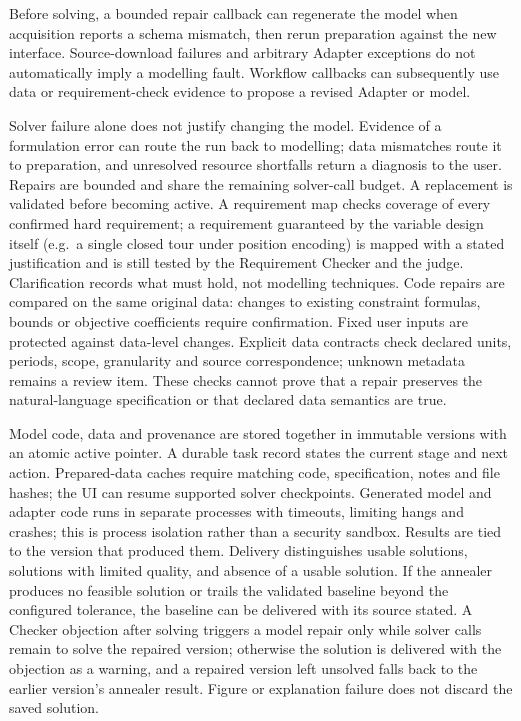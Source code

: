 Before solving, a bounded repair callback can regenerate the model when acquisition reports a schema mismatch,
then rerun preparation against the new interface. Source-download failures and arbitrary Adapter exceptions do
not automatically imply a modelling fault. Workflow callbacks can subsequently use data or requirement-check
evidence to propose a revised Adapter or model.

Solver failure alone does not justify changing the model. Evidence of a formulation error can route the run
back to modelling; data mismatches route it to preparation, and unresolved resource shortfalls return a
diagnosis to the user. Repairs are bounded and share the remaining solver-call budget. A replacement is
validated before becoming active. A requirement map checks coverage of every confirmed hard requirement; a requirement guaranteed by the variable
design itself (e.g.\ a single closed tour under position encoding) is mapped with a stated justification and is
still tested by the Requirement Checker and the judge. Clarification records what must hold, not modelling
techniques.
Code repairs are compared on the same original data: changes to existing constraint formulas, bounds or
objective coefficients require confirmation. Fixed user inputs are protected against data-level changes.
Explicit data contracts check declared units, periods, scope, granularity and source correspondence;
unknown metadata remains a review item. These checks cannot prove that a repair preserves the natural-language
specification or that declared data semantics are true.

Model code, data and provenance are stored together in immutable versions with an atomic active pointer.
A durable task record states the current stage and next action. Prepared-data caches require matching code,
specification, notes and file hashes; the UI can resume supported solver checkpoints.
Generated model and adapter code runs in separate processes with timeouts, limiting hangs and crashes; this
is process isolation rather than a security sandbox. Results are tied to the version that produced them.
Delivery distinguishes usable solutions, solutions with limited quality, and absence of a usable solution.
If the annealer produces no feasible solution or trails the validated baseline beyond the configured
tolerance, the baseline can be delivered with its source stated. A Checker objection after solving triggers a
model repair only while solver calls remain to solve the repaired version; otherwise the solution is delivered
with the objection as a warning, and a repaired version left unsolved falls back to the earlier version's
annealer result. Figure or explanation failure does not
discard the saved solution.


